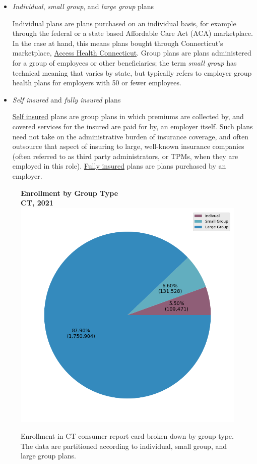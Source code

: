 \documentclass[12pt, a4paper,twoside,parskip=full]{report}
\theoremstyle{plain} %
\theoremstyle{definition} %
\theoremstyle{remark} %
\numberwithin{equation}{chapter}
\begin{document}
		\begin{itemize}
			\item \emph{Individual}, \emph{small group}, and \emph{large group} plans
			
			Individual plans are plans purchased on an individual basis, for example through the federal or a state based Affordable Care Act (ACA) marketplace. In the case at hand, this means plans bought through Connecticut's marketplace, \href{https://www.accesshealthct.com}{Access Health Connecticut}. Group plans are plans administered for a group of employees or other beneficiaries; the term \emph{small group} has technical meaning that varies by state, but typically refers to employer group health plans for employers with 50 or fewer employees.
			
			\item \emph{Self insured} and \emph{fully insured} plans
			
			\href{https://www.healthcare.gov/glossary/self-insured-plan/}{Self insured} plans are group plans in which premiums are collected by, and covered services for the insured are paid for by, an employer itself. Such plans need not take on the administrative burden of insurance coverage, and often outsource that aspect of insuring to large, well-known insurance companies (often referred to as third party administrators, or TPMs, when they are employed in this role). \href{https://www.healthcare.gov/glossary/fully-insured-job-based-plan/}{Fully insured} plans are plans purchased by an employer.
		\end{itemize}
	
		\begin{figure}[h!]
			\centering
			\textbf{Enrollment by Group Type}\\
			\textbf{CT, 2021}\\
			\includegraphics[width=.5\columnwidth]{images/ct_claims/enrollment_by_group_type.png}
			\caption{Enrollment in CT consumer report card broken down by group type. The data are partitioned according to individual, small group, and large group plans.}
			\label{ctenrollmentbygrouptype}
		\end{figure}
\end{document}
